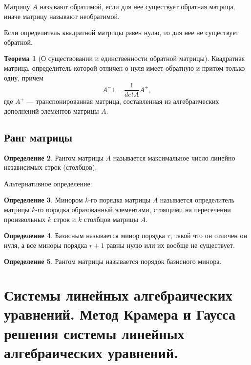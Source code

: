\documentclass[12pt]{report}
\theoremstyle{definition}
\newtheorem{theorem}{Теорема}[chapter]
\newtheorem{definition}[theorem]{Определение}
\begin{document}
Матрицу $A$ называют обратимой, если для нее существует обратная матрица,
иначе матрицу называют необратимой.

Если определитель квадратной матрицы равен нулю, то для нее не существует обратной.

\begin{theorem}[О существовании и единственности обратной матрицы]
Квадратная матрица, определитель которой отличен о нуля имеет обратную и притом только одну,
причем
$$
A^-1 = \dfrac{1}{det A} A^+,
$$
где $A^+$ --- транспонированная матрица, составленная из алгебраических
дополнений элементов матрицы $A$.
\end{theorem}

\subsection{Ранг матрицы}
\begin{definition}
Рангом матрицы $A$ называется максимальное число линейно независимых строк (столбцов).
\end{definition}

Альтернативное определение:
\begin{definition}
Минором $k$-го порядка матрицы $A$ называется определитель матрицы
$k$-го порядка образованный элементами, стоящими на пересечении произвольных
$k$ строк и $k$ столбцов матрицы $A$.
\end{definition}

\begin{definition}
Базисным называется минор порядка $r$, такой что он отличен он нуля, а все
миноры порядка $r+1$ равны нулю или их вообще не существует.
\end{definition}

\begin{definition}
Рангом матрицы называется порядок базисного минора.
\end{definition}


\section
{
  Системы линейных алгебраических уравнений.
  Метод Крамера и Гаусса решения системы линейных алгебраических уравнений.
}
\end{document}
